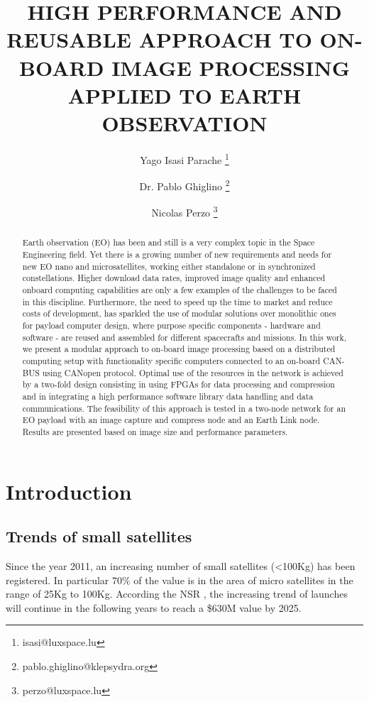 \documentclass[a4paper,twocolumn]{esapub2005} %
\title{HIGH PERFORMANCE AND REUSABLE APPROACH TO ON-BOARD IMAGE
PROCESSING APPLIED TO EARTH OBSERVATION}
\author[1]{Yago Isasi Parache \thanks{isasi@luxspace.lu}}
\affil{LuxSpace S\`arl, Luxembourg}
\author[2]{Dr. Pablo Ghiglino \thanks{ pablo.ghiglino@klepsydra.org}}
\affil{Klepsydra Robotics, GmbH. Zurich, Switzerland}
\author[1]{Nicolas Perzo \thanks{perzo@luxspace.lu}}
\begin{document}
\maketitle
{}
\begin{abstract}
Earth observation (EO) has been and still is a very complex topic in the Space Engineering field. Yet there is a growing number of new requirements and needs for new EO nano and microsatellites, working either standalone or in synchronized constellations. Higher download data rates, improved image quality and enhanced onboard computing capabilities are only a few examples of the challenges to be faced in this discipline. Furthermore, the need to speed up the time to market and reduce costs of development, has sparkled the use of modular solutions over monolithic ones for payload computer design, where purpose specific components - hardware and software - are reused and assembled for different spacecrafts and missions. In this work, we present a modular approach to on-board image processing based on a distributed computing setup with functionality specific computers connected to an on-board CAN-BUS using CANopen protocol. Optimal use of the resources in the network is achieved by a two-fold design consisting in using FPGAs for data processing and compression and in integrating a high performance software library data handling and data communications. The feasibility of this approach is tested in a two-node network for an EO payload with an image capture and compress node and an Earth Link node. Results are presented based on image size and performance parameters. 

\end{abstract}

\section{Introduction}
\subsection{Trends of small satellites}

Since the year 2011, an increasing number of small satellites (\textless 100Kg) has been registered. In particular 70\% of the value is in the area of micro satellites in the range of 25Kg to 100Kg. According the NSR \cite{NSR_WEB}, the increasing trend of launches will continue in the following years to reach a \$630M value by 2025.
\end{document}
